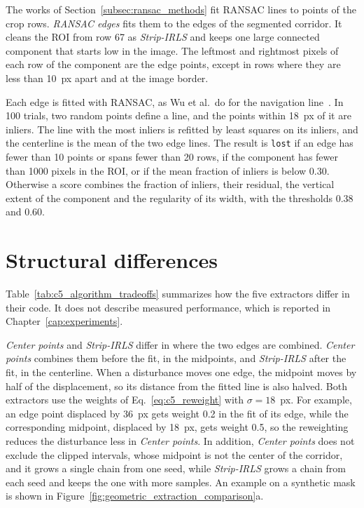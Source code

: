 The works of Section~\ref{subsec:ransac_methods} fit RANSAC lines to points of the crop rows. \textit{RANSAC edges} fits them to the edges of the segmented corridor. It cleans the ROI from row 67 as \textit{Strip-IRLS} and keeps one large connected component that starts low in the image. The leftmost and rightmost pixels of each row of the component are the edge points, except in rows where they are less than 10~px apart and at the image border.

Each edge is fitted with RANSAC, as Wu et al.\ do for the navigation line~\cite{wu2026deeplabv3}. In 100 trials, two random points define a line, and the points within 18~px of it are inliers. The line with the most inliers is refitted by least squares on its inliers, and the centerline is the mean of the two edge lines. The result is \texttt{lost} if an edge has fewer than 10 points or spans fewer than 20 rows, if the component has fewer than 1000 pixels in the ROI, or if the mean fraction of inliers is below 0.30. Otherwise a score combines the fraction of inliers, their residual, the vertical extent of the component and the regularity of its width, with the thresholds 0.38 and 0.60.

\section{Structural differences}
\label{sec:c5_structural_differences}

Table~\ref{tab:c5_algorithm_tradeoffs} summarizes how the five extractors differ in their code. It does not describe measured performance, which is reported in Chapter~\ref{cap:experiments}.

\textit{Center points} and \textit{Strip-IRLS} differ in where the two edges are combined. \textit{Center points} combines them before the fit, in the midpoints, and \textit{Strip-IRLS} after the fit, in the centerline. When a disturbance moves one edge, the midpoint moves by half of the displacement, so its distance from the fitted line is also halved. Both extractors use the weights of Eq.~\eqref{eq:c5_reweight} with $\sigma=18$~px. For example, an edge point displaced by 36~px gets weight 0.2 in the fit of its edge, while the corresponding midpoint, displaced by 18~px, gets weight 0.5, so the reweighting reduces the disturbance less in \textit{Center points}. In addition, \textit{Center points} does not exclude the clipped intervals, whose midpoint is not the center of the corridor, and it grows a single chain from one seed, while \textit{Strip-IRLS} grows a chain from each seed and keeps the one with more samples. An example on a synthetic mask is shown in Figure~\ref{fig:geometric_extraction_comparison}a.


